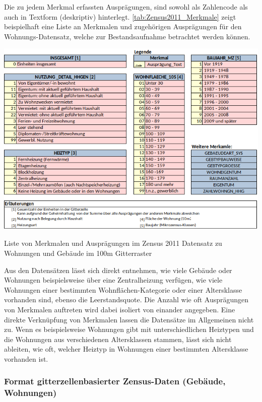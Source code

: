 				Die zu jedem Merkmal erfassten Ausprägungen, sind sowohl als Zahlencode als auch in Textform (deskriptiv) hinterlegt. \autoref{tab:Zensus2011_Merkmale} zeigt beispielhaft eine Liste an Merkmalen und zugehörigen Ausprägungen für den Wohnungs-Datensatz, welche zur Bestandsaufnahme betrachtet werden können. 
				
				\begin{table}[H]
					\includegraphics[width=1.00\textwidth]{Medien/tables/Zensus2011_Wohn_Geb_Merkmalev3.png}
					\caption{Liste von Merkmalen und Ausprägungen im Zensus 2011 Datensatz zu Wohnungen und Gebäude im 100m Gitterraster}
					\label{tab:Zensus2011_Merkmale}
				\end{table}
			
				Aus den Datensätzen lässt sich direkt entnehmen, wie viele Gebäude oder Wohnungen beispielsweise über eine Zentralheizung verfügen, wie viele Wohnungen einer bestimmten Wohnflächen-Kategorie oder einer Altersklasse vorhanden sind, ebenso die Leerstandsquote. Die Anzahl wie oft Ausprägungen von Merkmalen auftreten wird dabei isoliert von einander angegeben. Eine direkte Verknüpfung von Merkmalen lassen die Datensätze im Allgemeinen nicht zu. Wenn es beispielsweise Wohnungen gibt mit unterschiedlichen Heiztypen und die Wohnungen aus verschiedenen Altersklassen stammen, lässt sich nicht ableiten, wie oft, welcher Heiztyp in Wohnungen einer bestimmten Altersklasse vorhanden ist.
			
			\subsubsection{Format gitterzellenbasierter Zensus-Daten (Gebäude, Wohnungen)}
			\label{sec:Daten:Datensatz:Zensus2011:Aufbau}
			
